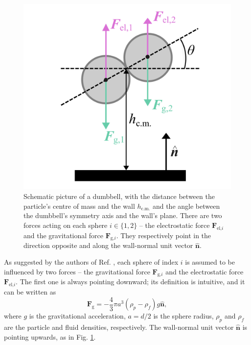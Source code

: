 \documentclass{master_thesis}
\begin{document}
\begin{figure}
    \centering
    \includegraphics[width=0.4\linewidth]{figures/dumbbell_forces.png}
    \caption{Schematic picture of a dumbbell, with the distance between the particle's centre of mass and the wall $h_{\textrm{c.m.}}$ and the angle between the dumbbell's symmetry axis and the wall's plane. There are two forces acting on each sphere $i\in \{ 1,2 \}$ -- the electrostatic force $\boldsymbol{F}_{\textrm{el,}i}$ and the gravitational force $\boldsymbol{F}_{\textrm{g,}i}$. They respectively point in the direction opposite and along the wall-normal unit vector $\hat{\boldsymbol{n}}$.}
    \label{fig:dumbbell_forces}
\end{figure}

As suggested by the authors of Ref. \cite{verweij2021}, each sphere of index $i$ is assumed to be influenced by two forces -- the gravitational force $\boldsymbol{F}_{\textrm{g,}i}$ and the electrostatic force $\boldsymbol{F}_{\textrm{el,}i}$. The first one is always pointing downward; its definition is intuitive, and it can be written as
\begin{equation}
    \boldsymbol{F}_{\textrm{g}} = -\frac{4}{3} \pi a^3 \left( \rho_p - \rho_f \right) g \hat{\boldsymbol{n}},
\label{eqn:gravitational_force}
\end{equation}
where $g$ is the gravitational acceleration, $a=d/2$ is the sphere radius, $\rho_p$ and $\rho_f$ are the particle and fluid densities, respectively. The wall-normal unit vector $\hat{\boldsymbol{n}}$ is pointing upwards, as in Fig. \ref{fig:dumbbell_forces}.
\end{document}
